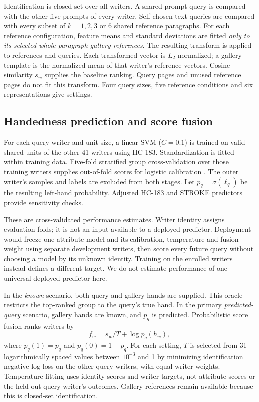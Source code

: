 \documentclass[5p,times,twocolumn,final,numbers,sort&compress]{elsarticle}
\begin{document}
Identification is closed-set over all writers. A shared-prompt query is compared with the other five prompts of every writer. Self-chosen-text queries are compared with every subset of $k=1,2,3$ or 6 shared reference paragraphs. For each reference configuration, feature means and standard deviations are fitted \emph{only to its selected whole-paragraph gallery references}. The resulting transform is applied to references and queries. Each transformed vector is $L_2$-normalized; a gallery template is the normalized mean of that writer's reference vectors. Cosine similarity $s_w$ supplies the baseline ranking. Query pages and unused reference pages do not fit this transform. Four query sizes, five reference conditions and six representations give \rSettings{} settings.

\subsection{Handedness prediction and score fusion}
For each query writer and unit size, a linear SVM ($C=0.1$) is trained on valid shared units of the other 41 writers using HC-183. Standardization is fitted within training data. Five-fold stratified group cross-validation over those training writers supplies out-of-fold scores for logistic calibration \cite{platt1999probabilistic}. The outer writer's samples and labels are excluded from both stages. Let $p_q=\sigma(\ell_q)$ be the resulting left-hand probability. Adjusted HC-183 and STROKE predictors provide sensitivity checks.

These are cross-validated performance estimates. Writer identity assigns evaluation folds; it is not an input available to a deployed predictor. Deployment would freeze one attribute model and its calibration, temperature and fusion weight using separate development writers, then score every future query without choosing a model by its unknown identity. Training on the enrolled writers instead defines a different target. We do not estimate performance of one universal deployed predictor here.

In the \emph{known} scenario, both query and gallery hands are supplied. This oracle restricts the top-ranked group to the query's true hand. In the primary \emph{predicted-query} scenario, gallery hands are known, and $p_q$ is predicted. Probabilistic score fusion ranks writers by
\begin{equation}
 f_w=s_w/T+\log p_q(h_w),
 \label{eq:fusion}
\end{equation}
where $p_q(1)=p_q$ and $p_q(0)=1-p_q$. For each setting, $T$ is selected from 31 logarithmically spaced values between $10^{-3}$ and 1 by minimizing identification negative log loss on the other query writers, with equal writer weights. Temperature fitting uses identity scores and writer targets, not attribute scores or the held-out query writer's outcomes. Gallery references remain available because this is closed-set identification.
\end{document}
